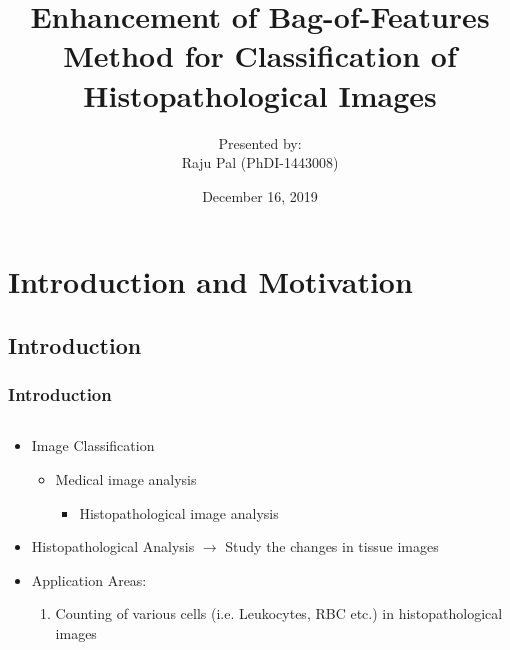 \documentclass [9pt,times] {beamer}
\title[Computer Science Engineering \& IT]{Enhancement of  Bag-of-Features Method for Classification of Histopathological Images}
\author[Raju Pal]{\small{Presented by: \\ Raju Pal (PhDI-1443008)}}
\institute[] %
{
	\textbf{\small Under Guidance of :}\\
	
	\small Dr. Mukesh Saraswat\\[0.5cm]
	\begin{figure}[h!]
		\begin{center}
			
			\texttt{[image: Figures/Intro/Logo]}
		\end{center}
	\end{figure}
	\vspace{0.5cm}
	\small  Department of Computer Science\\
	\small Jaypee Institute of Information Technology, Noida\\
	\vspace{0.5cm}
	
}
\date{December 16, 2019}
\begin{document}
	
\frame[plain]{\titlepage}
	
	

\section{Introduction and Motivation}
\subsection*{Introduction}\label{IC}
\begin{frame}\frametitle{Introduction}
\justifying
\fontsize{9pt}{11pt}\selectfont
\begin{columns}
	\begin{column}{7cm}
			\begin{itemize}
				\item Image Classification \\[1ex]
				\begin{itemize}					
					\item Medical image analysis   
						\begin{itemize}
							\item  \textcolor[rgb]{1.00,0.00,0.00} {Histopathological image analysis}
						\end{itemize}
				\end{itemize}
				\item Histopathological Analysis $\rightarrow$ \textcolor[rgb]{1.00,0.00,0.00}{Study the changes in tissue images}\\[1ex]
%						

		\item  \textcolor[rgb]{0.00,0.00,1.00}{Application Areas:}\\[1ex] 
			\begin{enumerate}
			\item Counting of various cells (i.e. Leukocytes, RBC etc.) in histopathological images \\[0.8ex] %
			

\end{enumerate}
\end{itemize}
\end{column}
\end{columns}
\end{frame}
\end{document}
